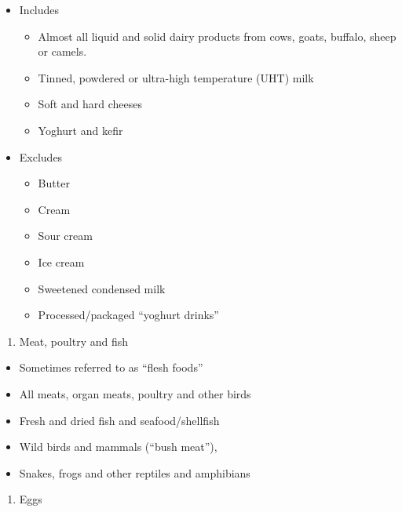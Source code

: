 \documentclass[12pt,]{book}
\providecommand{\tightlist}{%
  \setlength{\itemsep}{0pt}\setlength{\parskip}{0pt}}
\theoremstyle{definition}
\theoremstyle{definition}
\theoremstyle{definition}
\theoremstyle{remark}
\begin{document}
\begin{itemize}
\tightlist
\item
  Includes

  \begin{itemize}
  \tightlist
  \item
    Almost all liquid and solid dairy products from cows, goats,
    buffalo, sheep or camels.
  \item
    Tinned, powdered or ultra-high temperature (UHT) milk
  \item
    Soft and hard cheeses
  \item
    Yoghurt and kefir
  \end{itemize}
\item
  Excludes

  \begin{itemize}
  \tightlist
  \item
    Butter
  \item
    Cream
  \item
    Sour cream
  \item
    Ice cream
  \item
    Sweetened condensed milk
  \item
    Processed/packaged ``yoghurt drinks''
  \end{itemize}
\end{itemize}

\begin{enumerate}
\def\labelenumi{\arabic{enumi}.}
\setcounter{enumi}{4}
\tightlist
\item
  Meat, poultry and fish
\end{enumerate}

\begin{itemize}
\tightlist
\item
  Sometimes referred to as ``flesh foods''
\item
  All meats, organ meats, poultry and other birds
\item
  Fresh and dried fish and seafood/shellfish
\item
  Wild birds and mammals (``bush meat''),
\item
  Snakes, frogs and other reptiles and amphibians
\end{itemize}

\begin{enumerate}
\def\labelenumi{\arabic{enumi}.}
\setcounter{enumi}{5}
\tightlist
\item
  Eggs
\end{enumerate}
\end{document}
